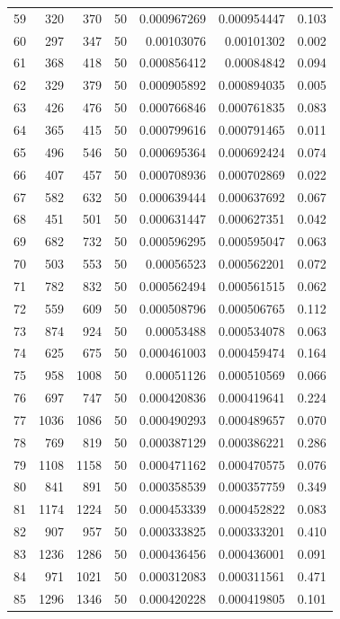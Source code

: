 \begin{tabular}{r r r r r r r}
59 & 320 & 370 & 50 & 0.000967269 & 0.000954447 & 0.103 \\
60 & 297 & 347 & 50 & 0.00103076 & 0.00101302 & 0.002 \\
61 & 368 & 418 & 50 & 0.000856412 & 0.00084842 & 0.094 \\
62 & 329 & 379 & 50 & 0.000905892 & 0.000894035 & 0.005 \\
63 & 426 & 476 & 50 & 0.000766846 & 0.000761835 & 0.083 \\
64 & 365 & 415 & 50 & 0.000799616 & 0.000791465 & 0.011 \\
65 & 496 & 546 & 50 & 0.000695364 & 0.000692424 & 0.074 \\
66 & 407 & 457 & 50 & 0.000708936 & 0.000702869 & 0.022 \\
67 & 582 & 632 & 50 & 0.000639444 & 0.000637692 & 0.067 \\
68 & 451 & 501 & 50 & 0.000631447 & 0.000627351 & 0.042 \\
69 & 682 & 732 & 50 & 0.000596295 & 0.000595047 & 0.063 \\
70 & 503 & 553 & 50 & 0.00056523 & 0.000562201 & 0.072 \\
71 & 782 & 832 & 50 & 0.000562494 & 0.000561515 & 0.062 \\
72 & 559 & 609 & 50 & 0.000508796 & 0.000506765 & 0.112 \\
73 & 874 & 924 & 50 & 0.00053488 & 0.000534078 & 0.063 \\
74 & 625 & 675 & 50 & 0.000461003 & 0.000459474 & 0.164 \\
75 & 958 & 1008 & 50 & 0.00051126 & 0.000510569 & 0.066 \\
76 & 697 & 747 & 50 & 0.000420836 & 0.000419641 & 0.224 \\
77 & 1036 & 1086 & 50 & 0.000490293 & 0.000489657 & 0.070 \\
78 & 769 & 819 & 50 & 0.000387129 & 0.000386221 & 0.286 \\
79 & 1108 & 1158 & 50 & 0.000471162 & 0.000470575 & 0.076 \\
80 & 841 & 891 & 50 & 0.000358539 & 0.000357759 & 0.349 \\
81 & 1174 & 1224 & 50 & 0.000453339 & 0.000452822 & 0.083 \\
82 & 907 & 957 & 50 & 0.000333825 & 0.000333201 & 0.410 \\
83 & 1236 & 1286 & 50 & 0.000436456 & 0.000436001 & 0.091 \\
84 & 971 & 1021 & 50 & 0.000312083 & 0.000311561 & 0.471 \\
85 & 1296 & 1346 & 50 & 0.000420228 & 0.000419805 & 0.101 \\

\end{tabular}
